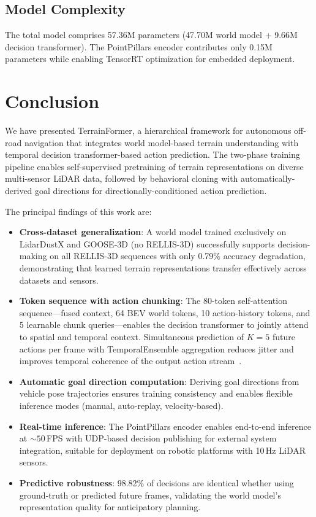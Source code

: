 \documentclass[journal]{IEEEtran}
\begin{document}
\subsection{Model Complexity}

The total model comprises 57.36M parameters (47.70M world model + 9.66M decision transformer). The PointPillars encoder contributes only 0.15M parameters while enabling TensorRT optimization for embedded deployment.

\section{Conclusion}
\label{sec:conclusion}

We have presented TerrainFormer, a hierarchical framework for autonomous off-road navigation that integrates world model-based terrain understanding with temporal decision transformer-based action prediction. The two-phase training pipeline enables self-supervised pretraining of terrain representations on diverse multi-sensor LiDAR data, followed by behavioral cloning with automatically-derived goal directions for directionally-conditioned action prediction.

The principal findings of this work are:

\begin{itemize}
    \item \textbf{Cross-dataset generalization}: A world model trained exclusively on LidarDustX and GOOSE-3D (no RELLIS-3D) successfully supports decision-making on all RELLIS-3D sequences with only 0.79\% accuracy degradation, demonstrating that learned terrain representations transfer effectively across datasets and sensors.
    \item \textbf{Token sequence with action chunking}: The 80-token self-attention sequence—fused context, 64 BEV world tokens, 10 action-history tokens, and 5 learnable chunk queries—enables the decision transformer to jointly attend to spatial and temporal context. Simultaneous prediction of $K{=}5$ future actions per frame with TemporalEnsemble aggregation reduces jitter and improves temporal coherence of the output action stream~\cite{zhao2023act}.
    \item \textbf{Automatic goal direction computation}: Deriving goal directions from vehicle pose trajectories ensures training consistency and enables flexible inference modes (manual, auto-replay, velocity-based).
    \item \textbf{Real-time inference}: The PointPillars encoder enables end-to-end inference at ${\sim}50$\,FPS with UDP-based decision publishing for external system integration, suitable for deployment on robotic platforms with 10\,Hz LiDAR sensors.
    \item \textbf{Predictive robustness}: 98.82\% of decisions are identical whether using ground-truth or predicted future frames, validating the world model's representation quality for anticipatory planning.
\end{itemize}
\end{document}
